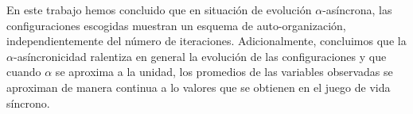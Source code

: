 \documentclass[../proyecto.tex]{memoir}
\begin{document}
En este trabajo hemos concluido que en situación de evolución $\alpha$-asíncrona, las configuraciones escogidas muestran un esquema de auto-organización, independientemente del número de iteraciones. Adicionalmente, concluimos que la $\alpha$-asíncronicidad ralentiza en general la evolución de las configuraciones y que cuando $\alpha$ se aproxima a la unidad, los promedios de las variables observadas se aproximan de manera continua a lo valores que se obtienen en el juego de vida síncrono. 

\newpage
\end{document}

